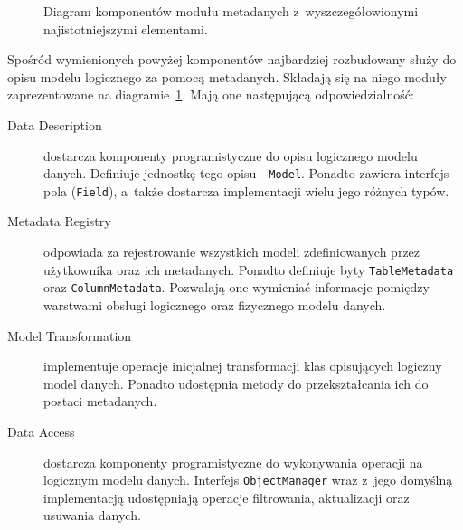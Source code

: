 \begin{figure}[ht!]
	\centering
	\caption{Diagram komponentów modułu metadanych z~wyszczegółowionymi najistotniejszymi elementami.}
	\label{fig:omc_metadata_components}
\end{figure}

Spośród wymienionych powyżej komponentów najbardziej rozbudowany służy do opisu modelu logicznego za pomocą metadanych. Składają się na niego moduły zaprezentowane na diagramie~\ref{fig:omc_metadata_components}. Mają one następującą odpowiedzialność:

\begin{description}
	\item[Data Description] dostarcza komponenty programistyczne do opisu logicznego modelu danych. Definiuje jednostkę tego opisu - \verb+Model+. Ponadto zawiera interfejs pola (\verb+Field+), a~także dostarcza implementacji wielu jego różnych typów.
	\item[Metadata Registry] odpowiada za rejestrowanie wszystkich modeli zdefiniowanych przez użytkownika oraz ich metadanych. Ponadto definiuje byty \verb+TableMetadata+ oraz \verb+ColumnMetadata+. Pozwalają one wymieniać informacje pomiędzy warstwami obsługi logicznego oraz fizycznego modelu danych. 
	\item[Model Transformation] implementuje operacje inicjalnej transformacji klas opisujących logiczny model danych. Ponadto udostępnia metody do przekształcania ich do postaci metadanych.
	\item[Data Access] dostarcza komponenty programistyczne do wykonywania operacji na logicznym modelu danych. Interfejs \verb+ObjectManager+ wraz z~jego domyślną implementacją udostępniają operacje filtrowania, aktualizacji oraz usuwania danych.
\end{description}

